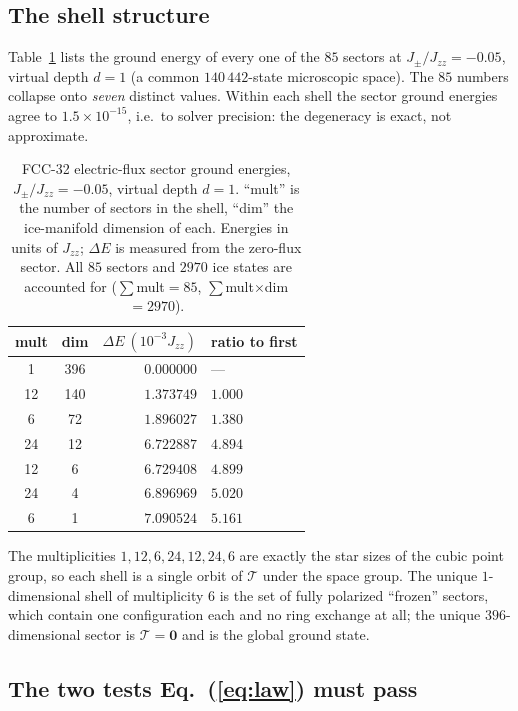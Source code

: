 \documentclass[aps,prb,preprint,amsmath,amssymb,superscriptaddress,
longbibliography,floatfix]{revtex4-2}
\newcommand{\Jzz}{J_{zz}}
\newcommand{\Jpm}{J_{\pm}}
\DeclareRobustCommand{\bT}{\bm{\mathcal T}}
\begin{document}
\subsection{The shell structure}

Table~\ref{tab:shells} lists the ground energy of every one of the $85$ sectors
at $\Jpm/\Jzz=-0.05$, virtual depth $d=1$ (a common $140\,442$-state
microscopic space).  The $85$ numbers collapse onto \emph{seven} distinct
values.  Within each shell the sector ground energies agree to
$1.5\times10^{-15}$, i.e.\ to solver precision: the degeneracy is exact, not
approximate.

\begin{table}[t]
\caption{FCC-32 electric-flux sector ground energies, $\Jpm/\Jzz=-0.05$,
virtual depth $d=1$.  ``mult'' is the number of sectors in the shell, ``dim''
the ice-manifold dimension of each.  Energies in units of $\Jzz$; $\Delta E$ is
measured from the zero-flux sector.  All $85$ sectors and $2970$ ice states are
accounted for ($\sum$mult$=85$, $\sum$mult$\times$dim$=2970$).}
\label{tab:shells}
\begin{ruledtabular}
\begin{tabular}{ccrl}
mult & dim & $\Delta E\ (10^{-3}\Jzz)$ & ratio to first\\ \hline
 1 & 396 & $0.000000$ & --- \\
12 & 140 & $1.373749$ & $1.000$\\
 6 &  72 & $1.896027$ & $1.380$\\
24 &  12 & $6.722887$ & $4.894$\\
12 &   6 & $6.729408$ & $4.899$\\
24 &   4 & $6.896969$ & $5.020$\\
 6 &   1 & $7.090524$ & $5.161$\\
\end{tabular}
\end{ruledtabular}
\end{table}

The multiplicities $1,12,6,24,12,24,6$ are exactly the star sizes of the cubic
point group, so each shell is a single orbit of $\bT$ under the space group.
The unique $1$-dimensional shell of multiplicity $6$ is the set of fully
polarized ``frozen'' sectors, which contain one configuration each and no ring
exchange at all; the unique $396$-dimensional sector is $\bT=\bm 0$ and is the
global ground state.

\subsection{The two tests Eq.~(\ref{eq:law}) must pass}
\end{document}
